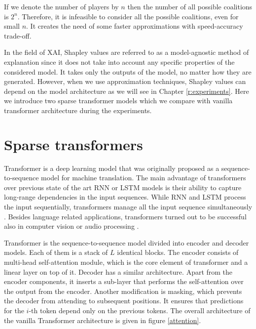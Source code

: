 \documentclass[magisterska,en]{pracamgr}
\begin{document}
If we denote the number of players by $n$ then the number of all possible coalitions is $2^n$. Therefore, it is infeasible to consider all the possible coalitions, even for small $n$. It creates the need of some faster approximations with speed-accuracy trade-off.


In the field of XAI, Shapley values are referred to as a model-agnostic method of explanation since it does not take into account any specific properties of the considered model. It takes only the outputs of the model, no matter how they are generated. However, when we use approximation techniques, Shapley values can depend on the model architecture as we will see in Chapter \ref{r:experiments}. Here we introduce two sparse transformer models which we compare with vanilla transformer architecture during the experiments.







\section{Sparse transformers}
Transformer \cite{DBLP:conf/nips/VaswaniSPUJGKP17} is a deep learning model that was originally proposed as a sequence-to-sequence model \cite{DBLP:conf/nips/SutskeverVL14} for machine translation. The main advantage of transformers over previous state of the art RNN or LSTM models is their ability to capture long-range dependencies in the input sequences. While RNN and LSTM process the input sequentially, transformers manage all the input sequence simultaneously \cite{DBLP:journals/corr/abs-2306-07303}.
Besides language related applications, transformers turned out to be successful also in computer vision \cite{DBLP:conf/iclr/DosovitskiyB0WZ21} or audio processing \cite{DBLP:journals/corr/abs-2106-04554}. 

Transformer is the sequence-to-sequence model divided into encoder and decoder models. Each of them is a stack of $L$ identical blocks. The encoder consists of multi-head self-attention module, which is the core element of transformer and a linear layer on top of it. Decoder has a similar architecture. Apart from the encoder components, it inserts a sub-layer that performs the self-attention over the output from the encoder. Another modification is masking, which prevents the decoder from attending to subsequent positions. It ensures that predictions for the $i$-th token depend only on the previous tokens. The overall architecture of the vanilla Transformer architecture is given in figure \ref{attention}.
\end{document}
